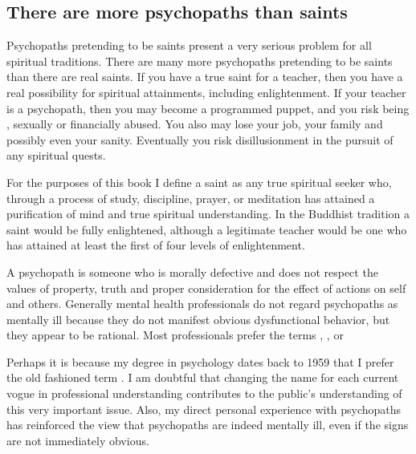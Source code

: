 \documentclass[a5paper,10pt,english]{book}
\begin{document}
\subsection{There are more psychopaths than saints}
\label{\detokenize{psychopaths:there-are-more-psychopaths-than-saints}}
\sphinxAtStartPar
Psychopaths pretending to be saints present a very serious problem for
all spiritual traditions. There are many more psychopaths pretending to
be saints than there are real saints. If you have a true saint for a
teacher, then you have a real possibility for spiritual attainments,
including enlightenment. If your teacher is a psychopath, then you may
become a programmed puppet, and you risk being , sexually or financially
abused. You also may lose your job, your family and possibly even your
sanity. Eventually you risk disillusionment in the pursuit of any
spiritual quests.

\sphinxAtStartPar
For the purposes of this book I define a saint as any true spiritual
seeker who, through a process of study, discipline, prayer, or
meditation has attained a purification of mind and true spiritual
understanding. In the Buddhist tradition a saint would be fully
enlightened, although a legitimate teacher would be one who has attained
at least the first of four levels of enlightenment.

\sphinxAtStartPar
A psychopath is someone who is morally defective and does not respect
the values of property, truth and proper consideration for the effect of
actions on self and others. Generally mental health professionals do not
regard psychopaths as mentally ill because they do not manifest obvious
dysfunctional behavior, but they appear to be rational. Most
professionals prefer the terms , ,
or 

\sphinxAtStartPar
Perhaps it is because my degree in psychology dates back to 1959 that I
prefer the old fashioned term . I am doubtful that
changing the name for each current vogue in professional understanding
contributes to the public’s understanding of this very important issue.
Also, my direct personal experience with psychopaths has reinforced the
view that psychopaths are indeed mentally ill, even if the signs are not
immediately obvious.
\end{document}
